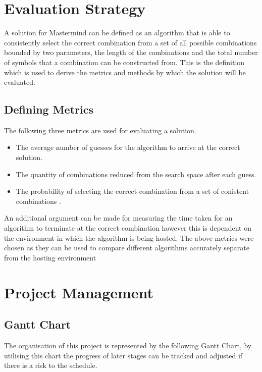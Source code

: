 \documentclass[11pt]{article}  %
\theoremstyle{definition}
\theoremstyle{remark}
\begin{document}
\newpage                     %
\section{Evaluation Strategy}\label{ss:back}

A solution for Mastermind can be defined as an algorithm that is able to consistently select the correct combination from a set of all possible combinations bounded by two parameters, the length of the combinations and the total number of symbols that a combination can be constructed from. This is the definition which is used to derive the metrics and methods by which the solution will be evaluated.

\subsection {Defining Metrics}

The following three metrics are used for evaluating a solution.
\begin {itemize}
	\item {The average number of guesses for the algorithm to arrive at the correct solution.}
	\item {The quantity of combinations reduced from the search space after each guess.}
	\item {The probability of selecting the correct combination from a set of conistent combinations \cite {ExhaustiveMM}.}
\end{itemize}

An additional argument can be made for measuring the time taken for an algorithm to terminate at the correct combination however this is dependent on the environment in which the algorithm is being hosted. The above metrics were chosen as they can be used to compare different algorithms accurately separate from the hosting environment

\newpage                     %
\section{Project Management}\label{ss:back}

\subsection {Gantt Chart}

The organisation of this project is represented by the following Gantt Chart, by utilising this chart the progress of later stages can be tracked and adjusted if there is a risk to the schedule.
\end{document}
